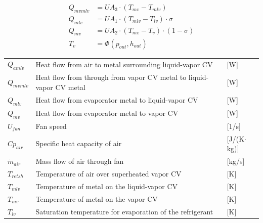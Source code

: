 \begin{align}
	Q_{mvmlv} & = U A_3 \cdot (T_{mv} - T_{mlv}) \label{eq:Q_mvml}             \\
	Q_{mlv}   & = U A_1 \cdot (T_{mlv} - T_{lv}) \cdot \sigma	\label{eq:Q_ml}  \\
	Q_{mv}    & = U A_2 \cdot (T_{mv} - T_v) \cdot (1- \sigma) \label{eq:Q_mv} \\
	T_v       & = \Phi(p_{out}, h_{out}) \label{eq:T_v}
\end{align}

\begin{center}
	\begin{tabular}{l p{10cm} l}
		$Q_{amlv}$      & Heat flow from air to metal surrounding liquid-vapor CV                           & [\si{W}]                          \\
		$Q_{mvmlv}$     & Heat flow from through from vapor CV metal to liquid-vapor CV metal               & [\si{W}]                          \\
		$Q_{mlv}$       & Heat flow from evaporator metal to liquid-vapor CV                                & [\si{W}]                          \\
		$Q_{mv}$        & Heat flow from evaporator metal to vapor CV                                       & [\si{W}]                          \\
		$U_{fan}$       & Fan speed                                                                         & [1/\si{s}]                        \\
		$Cp_{air}$      & Specific heat capacity of air                                                     & [\si{J}/(\si{K}$ \cdot $\si{kg})] \\
		$\dot{m}_{air}$ & Mass flow of air through fan                                                      & [\si{kg}/\si{s}]                  \\
		$T_{retsh}$     & Temperature of air over superheated vapor CV                                      & [\si{K}]                          \\
		$T_{mlv}$       & Temperature of metal on the liquid-vapor CV                                       & [\si{K}]                          \\
		$T_{mv}$        & Temperature of metal on the vapor CV                                              & [\si{K}]                          \\
		$T_{lv}$        & Saturation temperature for evaporation of the refrigerant                         & [\si{K}]                          \\

\end{tabular}
\end{center}
